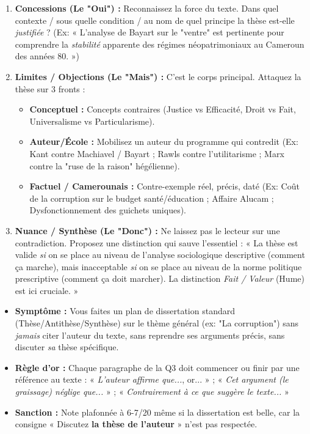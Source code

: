 \documentclass[11pt]{article}
\begin{document}
\begin{methode}
\begin{enumerate}
    \item \textbf{Concessions (Le "Oui") :} Reconnaissez la force du texte. Dans quel contexte / sous quelle condition / au nom de quel principe la thèse est-elle \emph{justifiée} ? (Ex: « L'analyse de Bayart sur le "ventre" est pertinente pour comprendre la \emph{stabilité} apparente des régimes néopatrimoniaux au Cameroun des années 80. »)
    \item \textbf{Limites / Objections (Le "Mais") :} C'est le corps principal. Attaquez la thèse sur 3 fronts :
        \begin{itemize}
            \item \textbf{Conceptuel :} Concepts contraires (Justice vs Efficacité, Droit vs Fait, Universalisme vs Particularisme).
            \item \textbf{Auteur/École :} Mobilisez un auteur du programme qui contredit (Ex: Kant contre Machiavel / Bayart ; Rawls contre l'utilitarisme ; Marx contre la "ruse de la raison" hégélienne).
            \item \textbf{Factuel / Camerounais :} Contre-exemple réel, précis, daté (Ex: Coût de la corruption sur le budget santé/éducation ; Affaire Alucam ; Dysfonctionnement des guichets uniques).
        \end{itemize}
    \item \textbf{Nuance / Synthèse (Le "Donc") :} Ne laissez pas le lecteur sur une contradiction. Proposez une distinction qui sauve l'essentiel : « La thèse est valide \emph{si} on se place au niveau de l'analyse sociologique descriptive (comment ça marche), mais inacceptable \emph{si} on se place au niveau de la norme politique prescriptive (comment ça doit marcher). La distinction \emph{Fait / Valeur} (Hume) est ici cruciale. »
\end{enumerate}
\end{methode}

\begin{attention}
\begin{itemize}
    \item \textbf{Symptôme :} Vous faites un plan de dissertation standard (Thèse/Antithèse/Synthèse) sur le thème général (ex: "La corruption") sans \emph{jamais} citer l'auteur du texte, sans reprendre ses arguments précis, sans discuter \emph{sa} thèse spécifique.
    \item \textbf{Règle d'or :} Chaque paragraphe de la Q3 doit commencer ou finir par une référence au texte : « \emph{L'auteur affirme que...}, or... » ; « \emph{Cet argument (le graissage) néglige que...} » ; « \emph{Contrairement à ce que suggère le texte...} »
    \item \textbf{Sanction :} Note plafonnée à 6-7/20 même si la dissertation est belle, car la consigne « Discutez \textbf{la thèse de l'auteur} » n'est pas respectée.
\end{itemize}
\end{attention}
\end{document}
